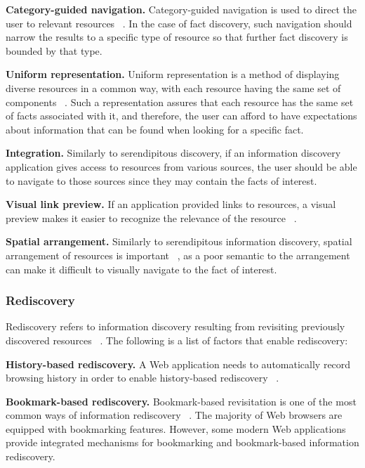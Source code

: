 \documentclass{casconpaper}
\begin{document}
{{\textbf{Category-guided navigation.} Category-guided navigation is used to direct the user to relevant resources ~\cite{levene}. In the case of fact discovery, such navigation should narrow the results to a specific type of resource so that further fact discovery is bounded by that type. 

\textbf{Uniform representation.} Uniform representation is a method of displaying diverse resources in a common way, with each resource having the same set of components ~\cite{herrera}. Such a representation assures that each resource has the same set of facts associated with it, and therefore, the user can afford to have expectations about information that can be found when looking for a specific fact.

\textbf{Integration.} Similarly to serendipitous discovery, if an information discovery application gives access to resources from various sources, the user should be able to navigate to those sources since they may contain the facts of interest.

\textbf{Visual link preview.} If an application provided links to resources, a visual preview makes it easier to recognize the relevance of the resource ~\cite{abrams}. 

\textbf{Spatial arrangement.} Similarly to serendipitous information discovery, spatial arrangement of resources is important ~\cite{abrams}, as a poor semantic to the arrangement can make it difficult to visually navigate to the fact of interest.


} %

{\subsubsection{Rediscovery}
Rediscovery refers to information discovery resulting from revisiting previously discovered resources ~\cite{tauscher}. The following is a list of factors that enable rediscovery:

\textbf{History-based rediscovery.} A Web application needs to automatically record browsing history in order to enable history-based rediscovery ~\cite{tauscher}.   

\textbf{Bookmark-based rediscovery.} Bookmark-based revisitation is one of the most common ways of information rediscovery ~\cite{abrams}. The majority of Web browsers are equipped with bookmarking features. However, some modern Web applications provide integrated mechanisms for bookmarking and bookmark-based information rediscovery.

}}
\end{document}
